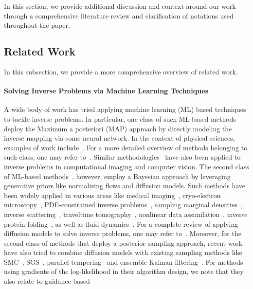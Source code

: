 \documentclass{article}
\numberwithin{equation}{section}
\begin{document}
In this section, we provide additional discussion and context around our work through a comprehensive literature review and clarification of notations used throughout the paper.

\subsection{Related Work}
\label{app: related work review}
In this subsection, we provide a more comprehensive overview of related work. 
\paragraph{Solving Inverse Problems via Machine Learning Techniques}

A wide body of work has tried applying machine learning (ML) based techniques to tackle inverse problems. In particular, one class of such ML-based methods deploy the Maximum a posteriori (MAP) approach by directly modeling the inverse mapping via some neural network. In the context of physical sciences, examples of work include~\cite{yoon2018analytic, khoo2019switchnet, fan2019solving1, fan2019solving2, fan2020solving, fournier2020artificial, sun2020extrapolated, sun2021deep, li2021accurate, li2022wide, zhou2023neural, fan2023solving,molinaro2023neural,melia2025multi}. For a more detailed overview of methods belonging to such class, one may refer to~\cite{arridge2019solving, ying2022solving}. Similar methodologies~\cite{zhang2018ista,gilton2019neumann,xiang2021fista} have also been applied to inverse problems in computational imaging and computer vision. The second class of ML-based methods~\cite{hou2019solving, zhang2021multiscale, whang2021solving, park2024solving, tao2025map,dasgupta2025unifying}, however, employ a Bayesian approach by leveraging generative priors like normalizing flows and diffusion models. Such methods have been widely applied in various areas like medical imaging~\cite{song2021solving, chung2022score, tuscore2025}, cryo-electron microscopy~\cite{kreis2022latent, levy2024solving}, PDE-constrained inverse problems~\cite{jiang2025ode}, sampling marginal densities~\cite{lindsey2025mne}, inverse scattering~\cite{zhang2024back}, traveltime tomography~\cite{cao2024subspace}, nonlinear data assimilation~\cite{ding2024nonlinear}, inverse protein folding~\cite{hsu2022learning, zhu2024bridge}, as well as fluid dynamics~\cite{chen2024probabilistic, xu2025diffusion,molinaro2024generative}. For a complete review of applying diffusion models to solve inverse problems, one may refer to~\cite{daras2024survey}. Moreover, for the second class of methods that deploy a posterior sampling approach, recent work have also tried to combine diffusion models with existing sampling methods like SMC~\cite{wu2023practical,cardoso2023monte, dou2024diffusion,albergo2024nets,chen2024sequential,vargas2023transport}, SGS~\cite{xu2024provably,wu2024principled,wang2025ensemble}, parallel tempering~\cite{zhang2025generalised} and ensemble Kalman filtering~\cite{zheng2024ensemble}. For methods using gradients of the log-likelihood in their algorithm design, we note that they also relate to guidance-based 
\end{document}
